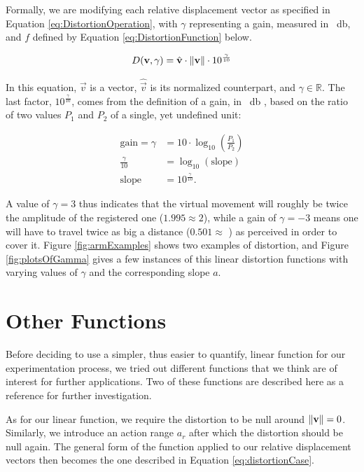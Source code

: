 Formally, we are modifying each relative displacement vector as specified in Equation \ref{eq:DistortionOperation}, with $\gamma$ representing a gain, measured in \SI{}{\decibel}, and $f$ defined by Equation \ref{eq:DistortionFunction} below.

\begin{equation}
\label{eq:DistortionFunction}
D(\mathbf{v},\gamma ) = \hat{\mathbf{v}} \cdot \lVert\mathbf{v}\rVert \cdot 10^{\frac{\gamma}{10}}
\end{equation}

In this equation, $\vec{v}$ is a vector, $\hat{\vec{v}}$ is its normalized counterpart, and $\gamma \in \mathbb{R}$. The last factor, $10^{\frac{\gamma}{10}}$, comes from the definition of a gain, in \SI{}{\decibel} \cite{book:decibel}, based on the ratio of two values $P_1$ and $P_2$ of a single, yet undefined unit:

\begin{align*}
    \text{gain} = \gamma &= 10 \cdot \log_{10} (\frac{P_1}{P_2})\\
    \frac{\gamma}{10} &= \log_{10} (\text{slope})\\
    \text{slope} &= 10^{\frac{\gamma}{10}}.
\end{align*}

A value of $\gamma = 3$ thus indicates that the virtual movement will roughly be twice the amplitude of the registered one ($1.995 \approx 2$), while a gain of $\gamma = -3$ means one will have to travel twice as big a distance ($0.501 \approx $ \textonehalf) as perceived in order to cover it. Figure \ref{fig:armExamples} shows two examples of distortion, and Figure \ref{fig:plotsOfGamma} gives a few instances of this linear distortion functions with varying values of $\gamma $ and the corresponding slope $a$.

\section{Other Functions}
\label{sec:otherFunctions}
Before deciding to use a simpler, thus easier to quantify, linear function for our experimentation process, we tried out different functions that we think are of interest for further applications. Two of these functions are described here as a reference for further investigation.

As for our linear function, we require the distortion to be null around $\lVert\mathbf{v}\rVert = 0$. Similarly, we introduce an action range $a_r$ after which the distortion should be null again. The general form of the function applied to our relative displacement vectors then becomes the one described in Equation \ref{eq:distortionCase}.

